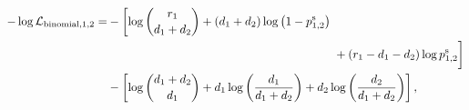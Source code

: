 \documentclass{article}
\begin{document}
{
\newcommand{\firstline}{\log\binom{r_1}{d_1+d_2} + (d_1+d_2) \log \left(1-p_{1,2}^\text{s}\right)}
\newcommand{\secondline}{+ (r_1-d_1-d_2) \log p_{1,2}^\text{s}}
\begin{align}
\begin{aligned}
-\log \mathcal{L}_{\text{binomial},1,2} =&-\left[\firstline\vphantom{\secondline}\right. \\
&\hphantom{-\left[\firstline\vphantom{\secondline}\right.}\left.\vphantom{\firstline}\secondline\right] \\
&-\left[\log\binom{d_1+d_2}{d_1} + d_1 \log \left(\frac{d_1}{d_1+d_2}\right) + d_2 \log \left(\frac{d_2}{d_1+d_2}\right)\right],
\end{aligned}
\label{eq:test}
\end{align}
}
\end{document}
